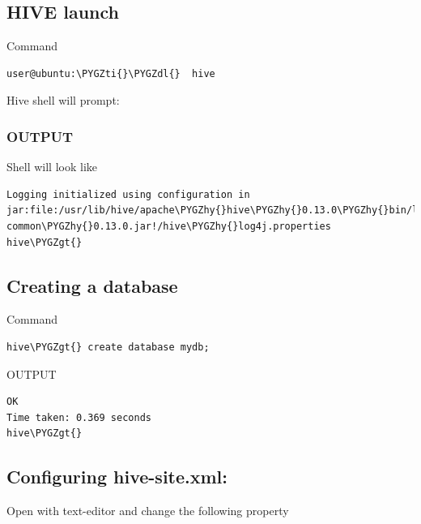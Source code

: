 \documentclass[letterpaper,10pt,english]{sphinxmanual}
\def\PYGZgt{\char`\>}
\def\PYGZdl{\char`\$}
\def\PYGZhy{\char`\-}
\def\PYGZti{\char`\~}
\begin{document}
\subsection{HIVE launch}
\label{hive:hive-launch}
Command

\begin{Verbatim}[commandchars=\\\{\}]
user@ubuntu:\PYGZti{}\PYGZdl{}  hive
\end{Verbatim}

Hive shell will prompt:


\subsubsection{OUTPUT}
\label{hive:output}
Shell will look like

\begin{Verbatim}[commandchars=\\\{\}]
Logging initialized using configuration in jar:file:/usr/lib/hive/apache\PYGZhy{}hive\PYGZhy{}0.13.0\PYGZhy{}bin/lib/hive\PYGZhy{} common\PYGZhy{}0.13.0.jar!/hive\PYGZhy{}log4j.properties
hive\PYGZgt{}
\end{Verbatim}


\subsection{Creating a database}
\label{hive:creating-a-database}
Command

\begin{Verbatim}[commandchars=\\\{\}]
hive\PYGZgt{} create database mydb;
\end{Verbatim}

OUTPUT

\begin{Verbatim}[commandchars=\\\{\}]
OK
Time taken: 0.369 seconds
hive\PYGZgt{}
\end{Verbatim}


\subsection{Configuring hive-site.xml:}
\label{hive:configuring-hive-site-xml}
Open with text-editor and change the following property
\end{document}
